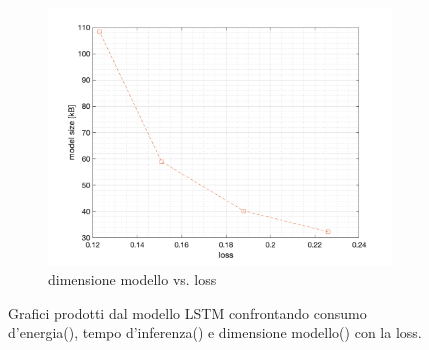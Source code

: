\begin{figure}[!htb]
\begin{subfigure}{.45\textwidth}
        \includegraphics[width=\textwidth]{figure/lstm_size_loss.png}
        \caption{dimensione modello vs. loss}
        \label{fig:performance-lstm-hexi:lstm-size-loss}
    \end{subfigure}
    \caption{Grafici prodotti dal modello LSTM confrontando consumo d'energia(), tempo d'inferenza() e dimensione modello() con la loss.}
    \label{fig:performance-lstm-hexi}
\end{figure}

